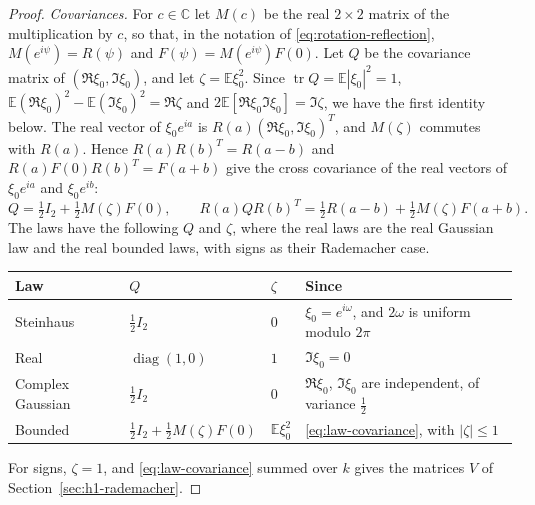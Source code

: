 \begin{proof}
\medskip
\noindent\emph{Covariances.}
For $c\in\mathbb C$ let $M(c)$ be the real $2\times2$ matrix of the
multiplication by $c$, so that, in the notation of
\eqref{eq:rotation-reflection}, $M(e^{i\psi})=R(\psi)$ and
$F(\psi)=M(e^{i\psi})F(0)$.
Let $Q$ be the covariance matrix of $(\Re\xi_0,\Im\xi_0)$, and let
$\zeta=\mathbb E\xi_0^2$.
Since $\operatorname{tr}Q=\mathbb E|\xi_0|^2=1$,
$\mathbb E(\Re\xi_0)^2-\mathbb E(\Im\xi_0)^2=\Re\zeta$ and
$2\mathbb E[\Re\xi_0\Im\xi_0]=\Im\zeta$, we have the first identity below.
The real vector of $\xi_0e^{ia}$ is $R(a)(\Re\xi_0,\Im\xi_0)^T$, and
$M(\zeta)$ commutes with $R(a)$. Hence $R(a)R(b)^T=R(a-b)$ and
$R(a)F(0)R(b)^T=F(a+b)$ give the cross covariance of the real vectors of
$\xi_0e^{ia}$ and $\xi_0e^{ib}$:
\begin{equation}
 Q=\tfrac12I_2+\tfrac12M(\zeta)F(0),\qquad
 R(a)QR(b)^T=\tfrac12R(a-b)+\tfrac12M(\zeta)F(a+b).
 \label{eq:law-covariance}
\end{equation}
The laws have the following $Q$ and $\zeta$, where the real laws are
the real Gaussian law and the real bounded laws, with signs as their
Rademacher case.
\begin{center}
\small
\begin{tabular}{@{}llll@{}}
\toprule
Law & $Q$ & $\zeta$ & Since\\
\midrule
Steinhaus & $\tfrac12I_2$ & $0$
 & $\xi_0=e^{i\omega}$, and $2\omega$ is uniform modulo $2\pi$\\
Real & $\operatorname{diag}(1,0)$ & $1$
 & $\Im\xi_0=0$\\
Complex Gaussian & $\tfrac12I_2$ & $0$
 & $\Re\xi_0$, $\Im\xi_0$ are independent, of variance $\tfrac12$\\
Bounded & $\tfrac12I_2+\tfrac12M(\zeta)F(0)$ & $\mathbb E\xi_0^2$
 & \eqref{eq:law-covariance}, with $|\zeta|\le1$\\
\bottomrule
\end{tabular}
\end{center}
For signs, $\zeta=1$, and \eqref{eq:law-covariance} summed over $k$
gives the matrices $V$ of Section~\ref{sec:h1-rademacher}.


\end{proof}
